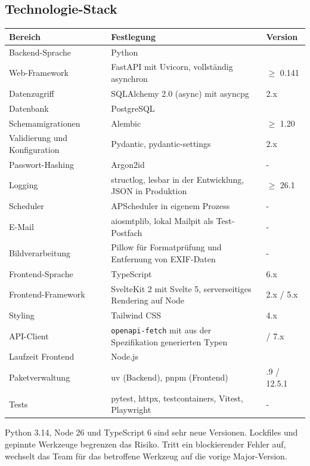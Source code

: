 \documentclass[11pt,a4paper]{article}
\begin{document}
\subsection{Technologie-Stack}

\begin{tabularx}{\linewidth}{@{}>{\hsize=0.91\hsize\RaggedRight\arraybackslash}X >{\hsize=1.37\hsize\RaggedRight\arraybackslash}X >{\hsize=0.72\hsize\RaggedRight\arraybackslash}X@{}}
\toprule
\textbf{Bereich} & \textbf{Festlegung} & \textbf{Version} \\
\midrule
\endhead
Backend-Sprache & Python & 3.14 \\
Web-Framework & FastAPI mit Uvicorn, vollständig asynchron & $\geq$ 0.141 \\
Datenzugriff & SQLAlchemy 2.0 (async) mit asyncpg & 2.x \\
Datenbank & PostgreSQL & 17 \\
Schemamigrationen & Alembic & $\geq$ 1.20 \\
Validierung und Konfiguration & Pydantic, pydantic-settings & 2.x \\
Passwort-Hashing & Argon2id & - \\
Logging & structlog, lesbar in der Entwicklung, JSON in Produktion & $\geq$ 26.1 \\
Scheduler & APScheduler in eigenem Prozess & - \\
E-Mail & aiosmtplib, lokal Mailpit als Test-Postfach & - \\
Bildverarbeitung & Pillow für Formatprüfung und Entfernung von EXIF-Daten & - \\
Frontend-Sprache & TypeScript & 6.x \\
Frontend-Framework & SvelteKit 2 mit Svelte 5, serverseitiges Rendering auf Node & 2.x / 5.x \\
Styling & Tailwind CSS & 4.x \\
API-Client & \texttt{openapi-fetch} mit aus der Spezifikation generierten Typen & 0.17 / 7.x \\
Laufzeit Frontend & Node.js & 26 \\
Paketverwaltung & uv (Backend), pnpm (Frontend) & 0.12.9 / 12.5.1 \\
Tests & pytest, httpx, testcontainers, Vitest, Playwright & - \\
\bottomrule
\end{tabularx}

Python 3.14, Node 26 und TypeScript 6 sind sehr neue Versionen. Lockfiles und gepinnte Werkzeuge begrenzen das Risiko. Tritt ein blockierender Fehler auf, wechselt das Team für das betroffene Werkzeug auf die vorige Major-Version.
\end{document}
